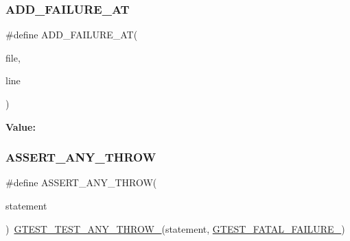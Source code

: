 \subsubsection{\texorpdfstring{ADD\_FAILURE\_AT}{ADD\_FAILURE\_AT}}
{\footnotesize\ttfamily \#define A\+D\+D\+\_\+\+F\+A\+I\+L\+U\+R\+E\+\_\+\+AT(\begin{DoxyParamCaption}\item[{}]{file,  }\item[{}]{line }\end{DoxyParamCaption})}

{\bfseries Value\+:}
\begin{DoxyCode}{0}

\end{DoxyCode}
\mbox{\label{_obj__test_2lib_2googletest-master_2googletest_2include_2gtest_2gtest_8h_affadeef9379fe5aabf6f28d9eab9d3c0}} 
\subsubsection{\texorpdfstring{ASSERT\_ANY\_THROW}{ASSERT\_ANY\_THROW}}
{\footnotesize\ttfamily \#define A\+S\+S\+E\+R\+T\+\_\+\+A\+N\+Y\+\_\+\+T\+H\+R\+OW(\begin{DoxyParamCaption}\item[{}]{statement }\end{DoxyParamCaption})~\mbox{\hyperlink{_obj__test_2lib_2googletest-release-1_88_81_2googletest_2include_2gtest_2internal_2gtest-internal_8h_af48bbd26d54d4afc5e4cef39b1c76ba3}{G\+T\+E\+S\+T\+\_\+\+T\+E\+S\+T\+\_\+\+A\+N\+Y\+\_\+\+T\+H\+R\+O\+W\+\_\+}}(statement, \mbox{\hyperlink{_obj__test_2lib_2googletest-release-1_88_81_2googletest_2include_2gtest_2internal_2gtest-internal_8h_a0f9a4c3ea82cc7bf4478eaffdc168358}{G\+T\+E\+S\+T\+\_\+\+F\+A\+T\+A\+L\+\_\+\+F\+A\+I\+L\+U\+R\+E\+\_\+}})}

\mbox{\label{_obj__test_2lib_2googletest-master_2googletest_2include_2gtest_2gtest_8h_a6617da62e5ae5490995a3bfca1f331a9}} 
